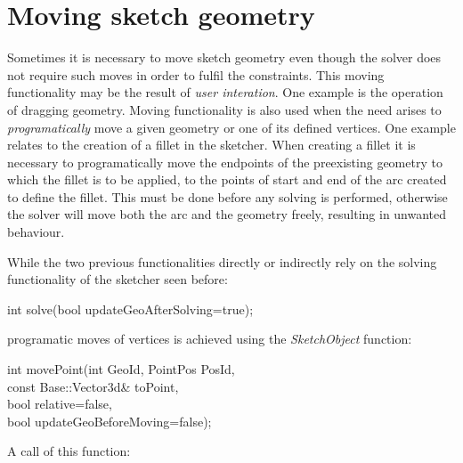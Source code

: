 \documentclass[12pt,twoside,a4paper]{book}
\newcommand{\SketchObject}{\emph{SketchObject}}
\begin{document}
    \section{Moving sketch geometry}
    \label{sec:sketcher:movingsketchgeometry}
    Sometimes it is necessary to move sketch geometry even though the solver does not require such moves in order to fulfil the constraints. This moving functionality may be the result of \emph{user interation}. One example is the operation of dragging geometry. Moving functionality is also used when the need arises to \emph{programatically} move a given geometry or one of its defined vertices. One example relates to the creation of a fillet in the sketcher. When creating a fillet it is necessary to programatically move the endpoints of the preexisting geometry to which the fillet is to be applied, to the points of start and end of the arc created to define the fillet. This must be done before any solving is performed, otherwise the solver will move both the arc and the geometry freely, resulting in unwanted behaviour.

    While the two previous functionalities directly or indirectly rely on the solving functionality of the sketcher seen before:

    \begin{codequote}
    int solve(bool updateGeoAfterSolving=true);
    \end{codequote}

    programatic moves of vertices is achieved using the \SketchObject{} function:

    \begin{codequote}
    int movePoint(int GeoId, PointPos PosId, \\
    \-\hspace{2.7cm}const Base::Vector3d\& toPoint, \\
    \-\hspace{2.7cm}bool relative=false, \\
    \-\hspace{2.7cm}bool updateGeoBeforeMoving=false);
    \end{codequote}

    A call of this function:
\end{document}
